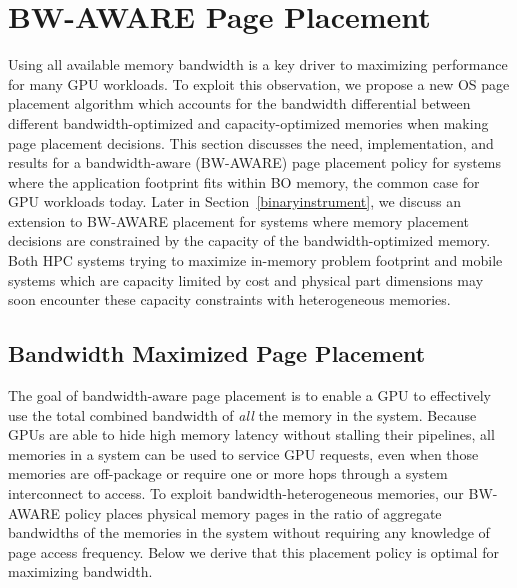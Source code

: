 \section{BW-AWARE Page Placement}
\label{bwawareplacement}
Using all available memory bandwidth is a key driver to maximizing 
performance for many GPU workloads.
To exploit this observation, we propose a new OS page placement algorithm which
accounts for the bandwidth differential between different bandwidth-optimized and 
capacity-optimized memories
when making page placement decisions.  This section discusses the need,
implementation, and results for a bandwidth-aware (BW-AWARE) page placement
policy for systems where the application footprint fits within BO memory, the
common case for GPU workloads today.  Later in Section~\ref{binaryinstrument},
we discuss an extension to BW-AWARE placement for systems where memory placement
decisions are constrained by the capacity of the
bandwidth-optimized memory.  Both HPC systems trying to maximize in-memory
problem footprint and mobile systems which are capacity limited by cost and
physical part dimensions may soon encounter these capacity constraints with
heterogeneous memories.

\subsection{Bandwidth Maximized Page Placement}
\label{unconstrained}
The goal of bandwidth-aware page placement is to enable a GPU
to effectively use the total combined bandwidth of {\color{black}\emph{all} the} memory in the
system.  Because GPUs are able to hide high memory latency without stalling
their pipelines, all memories in a system can be used to service GPU requests, 
even when those memories are off-package or require one or more hops
through a system interconnect to access.
To exploit bandwidth-heterogeneous memories,
our BW-AWARE policy places physical memory pages in the ratio of aggregate 
bandwidths of the memories in the system without requiring any knowledge of page
access frequency. Below we derive that this placement policy is optimal for maximizing
bandwidth.

